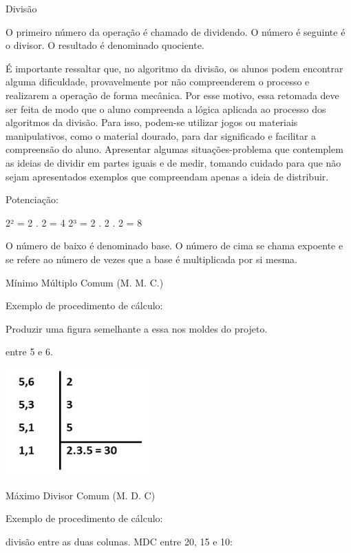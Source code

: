 Divisão


O primeiro número da operação é chamado de dividendo. O número é
seguinte é o divisor. O resultado é denominado quociente.

É importante ressaltar que, no algoritmo da divisão, os alunos podem
encontrar alguma dificuldade, provavelmente por não compreenderem o
processo e realizarem a operação de forma mecânica. Por esse motivo,
essa retomada deve ser feita de modo que o aluno compreenda a lógica
aplicada ao processo dos algoritmos da divisão. Para isso, podem-se
utilizar jogos ou materiais manipulativos, como o material dourado, para
dar significado e facilitar a compreensão do aluno. Apresentar algumas
situações-problema que contemplem as ideias de dividir em partes iguais
e de medir, tomando cuidado para que não sejam apresentados exemplos que
compreendam apenas a ideia de distribuir.

Potenciação:

2² = 2 . 2 = 4 2³ = 2 . 2 . 2 = 8

O número de baixo é denominado base. O número de cima se chama expoente
e se refere ao número de vezes que a base é multiplicada por si mesma.

Mínimo Múltiplo Comum (M. M. C.)

Exemplo de procedimento de cálculo:

Produzir uma figura semelhante a essa nos moldes do projeto.

entre 5 e 6.

\includegraphics[width=2.18605in,height=1.62945in]{./imgSAEB_6_MAT/media/image21.jpeg}

Máximo Divisor Comum (M. D. C)

Exemplo de procedimento de cálculo:

divisão entre as duas colunas. MDC entre 20, 15 e 10:

